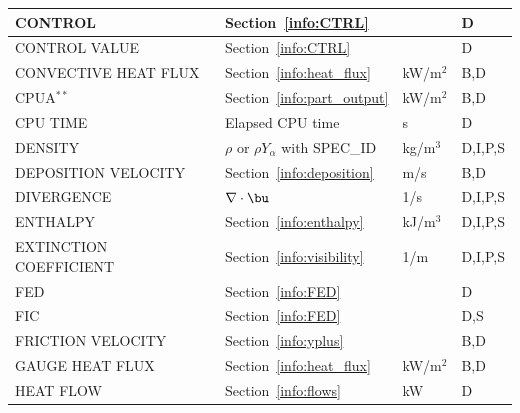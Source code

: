\documentclass[11pt]{book}
\begin{document}
\begin{longtable}{@{\extracolsep{\fill}}|l|l|l|l|}
{\ct CONTROL}                                   & Section~\ref{info:CTRL}                       &                & D            \\ \hline
{\ct CONTROL VALUE}                             & Section~\ref{info:CTRL}                       &                & D            \\ \hline
{\ct CONVECTIVE HEAT FLUX}                      & Section~\ref{info:heat_flux}                  & kW/m$^2$       & B,D          \\ \hline
{\ct CPUA}$^{**}$                               & Section~\ref{info:part_output}                & kW/m$^2$       & B,D          \\ \hline
{\ct CPU TIME}                                  & Elapsed CPU time                              & s              & D            \\ \hline
{\ct DENSITY}                                   & $\rho$ or $\rho Y_\alpha$ with {\ct SPEC\_ID} & kg/m$^3$       & D,I,P,S      \\ \hline
{\ct DEPOSITION VELOCITY}                       & Section~\ref{info:deposition}                 & m/s            & B,D          \\ \hline
{\ct DIVERGENCE}                                & $\nabla \cdot \bu$                            & 1/s            & D,I,P,S      \\ \hline
{\ct ENTHALPY}                                  & Section~\ref{info:enthalpy}                   & kJ/m$^3$       & D,I,P,S      \\ \hline
{\ct EXTINCTION COEFFICIENT}                    & Section~\ref{info:visibility}                 & 1/m            & D,I,P,S      \\ \hline
{\ct FED}                                       & Section~\ref{info:FED}                        &                & D            \\ \hline
{\ct FIC}                                       & Section~\ref{info:FED}                        &                & D,S          \\ \hline
{\ct FRICTION VELOCITY}                         & Section~\ref{info:yplus}                      &                & B,D          \\ \hline
{\ct GAUGE HEAT FLUX}                           & Section~\ref{info:heat_flux}                  & kW/m$^2$       & B,D          \\ \hline
{\ct HEAT FLOW}                                 & Section~\ref{info:flows}                      & kW             & D            \\ \hline

\end{longtable}
\end{document}
